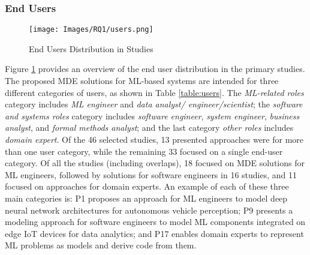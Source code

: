 \subsubsection{End Users}

\begin{figure}[htbp]
    \centering
    \texttt{[image: Images/RQ1/users.png]}
    \caption{End Users Distribution in Studies}
    \label{fig:users}
\end{figure}

Figure \ref{fig:users} provides an overview of the end user distribution in the primary studies. The proposed MDE solutions for ML-based systems are intended for three different categories of users, as shown in Table \ref{table:users}. The \textit{ML-related roles} category includes \textit{ML engineer} and \textit{data analyst/ engineer/scientist}; the \textit{software and systems roles} category includes \textit{software engineer}, \textit{system engineer}, \textit{business analyst}, and \textit{formal methods analyst}; and the last category \textit{other roles} includes \textit{domain expert}. Of the 46 selected studies, 13 presented approaches were for more than one user category, while the remaining 33 focused on a single end-user category. Of all the studies (including overlaps), 18 focused on MDE solutions for ML engineers, followed by solutions for software engineers in 16 studies, and 11 focused on approaches for domain experts. An example of each of these three main categories is: P1 proposes an approach for ML engineers to model deep neural network architectures for autonomous vehicle perception; P9 presents a modeling approach for software engineers to model ML components integrated on edge IoT devices for data analytics; 
and P17 enables domain experts to represent ML problems as models and derive code from them.


